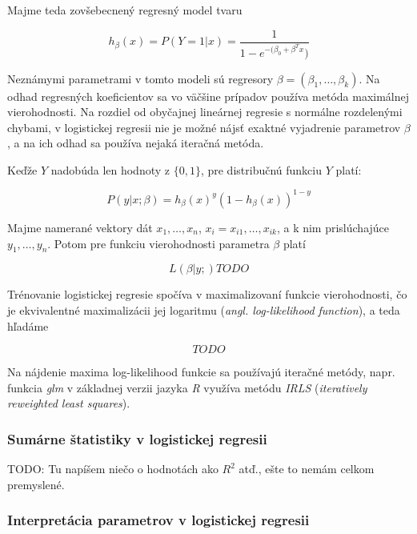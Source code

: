 Majme teda zovšebecnený regresný model tvaru

\[
h_\beta(x) = P(Y = 1|x) = \frac{1}{1 - e^{-(\beta_0 + \beta^T x})}
\]

Neznámymi parametrami v tomto modeli sú regresory \( \beta = (\beta_1, \ldots, \beta_k) \).
Na odhad regresných koeficientov sa vo väčšine prípadov používa metóda maximálnej vierohodnosti.
Na rozdiel od obyčajnej lineárnej regresie s normálne rozdelenými chybami, v logistickej regresii nie je možné nájsť exaktné vyjadrenie parametrov \( \beta \),
a na ich odhad sa používa nejaká iteračná metóda.

Keďže \(Y\) nadobúda len hodnoty z \( \{0, 1\} \), pre distribučnú funkciu \(Y\) platí:

\[
P(y | x; \beta ) = h_\beta(x)^y (1 - h_\beta(x))^{1 - y}
\]

Majme namerané vektory dát \( x_1, \ldots, x_n \), \( x_i = x_{i1}, \ldots, x_{ik} \),
a k nim prislúchajúce \( y_1, \ldots, y_n \). Potom pre funkciu vierohodnosti parametra \( \beta \) platí

\[
L(\beta | y; ) TODO
\]

Trénovanie logistickej regresie spočíva v maximalizovaní funkcie vierohodnosti,
čo je ekvivalentné maximalizácii jej logaritmu (\emph{angl. log-likelihood function}), a teda hľadáme

\[
TODO
\]

Na nájdenie maxima log-likelihood funkcie sa používajú iteračné metódy,
napr. funkcia \emph{glm} v základnej verzii jazyka \emph{R} využíva metódu \emph{IRLS} (\emph{iteratively reweighted least squares}).

\subsubsection{Sumárne štatistiky v logistickej regresii}

TODO: Tu napíšem niečo o hodnotách ako \(R^2\) atď., ešte to nemám celkom premyslené.

\subsubsection{Interpretácia parametrov v logistickej regresii}